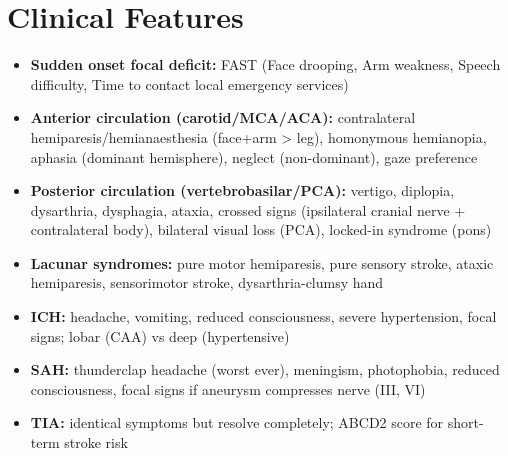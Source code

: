 \section*{Clinical Features}
\begin{itemize}
    \item \textbf{Sudden onset focal deficit:} FAST (Face drooping, Arm weakness, Speech difficulty, Time to contact local emergency services)
    \item \textbf{Anterior circulation (carotid/MCA/ACA):} contralateral hemiparesis/hemianaesthesia (face+arm > leg), homonymous hemianopia, aphasia (dominant hemisphere), neglect (non-dominant), gaze preference
    \item \textbf{Posterior circulation (vertebrobasilar/PCA):} vertigo, diplopia, dysarthria, dysphagia, ataxia, crossed signs (ipsilateral cranial nerve + contralateral body), bilateral visual loss (PCA), locked-in syndrome (pons)
    \item \textbf{Lacunar syndromes:} pure motor hemiparesis, pure sensory stroke, ataxic hemiparesis, sensorimotor stroke, dysarthria-clumsy hand
    \item \textbf{ICH:} headache, vomiting, reduced consciousness, severe hypertension, focal signs; lobar (CAA) vs deep (hypertensive)
    \item \textbf{SAH:} thunderclap headache (worst ever), meningism, photophobia, reduced consciousness, focal signs if aneurysm compresses nerve (III, VI)
    \item \textbf{TIA:} identical symptoms but resolve completely; ABCD2 score for short-term stroke risk
\end{itemize}

